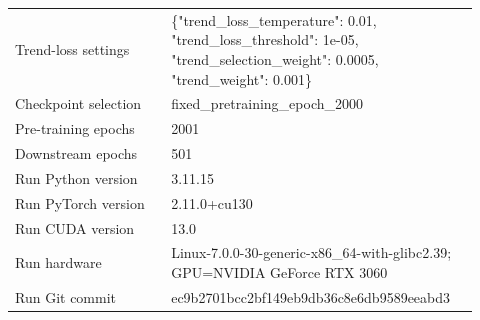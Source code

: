 \begin{table}[p]
\begin{tabular}{p{0.32\linewidth}p{0.60\linewidth}}
Trend-loss settings & \{"trend\_loss\_temperature": 0.01, "trend\_loss\_threshold": 1e-05, "trend\_selection\_weight": 0.0005, "trend\_weight": 0.001\} \\
Checkpoint selection & fixed\_pretraining\_epoch\_2000 \\
Pre-training epochs & 2001 \\
Downstream epochs & 501 \\
Run Python version & 3.11.15 \\
Run PyTorch version & 2.11.0+cu130 \\
Run CUDA version & 13.0 \\
Run hardware & Linux-7.0.0-30-generic-x86\_64-with-glibc2.39; GPU=NVIDIA GeForce RTX 3060 \\
Run Git commit & ec9b2701bcc2bf149eb9db36c8e6db9589eeabd3 \\
\bottomrule
\end{tabular}
\end{table}
